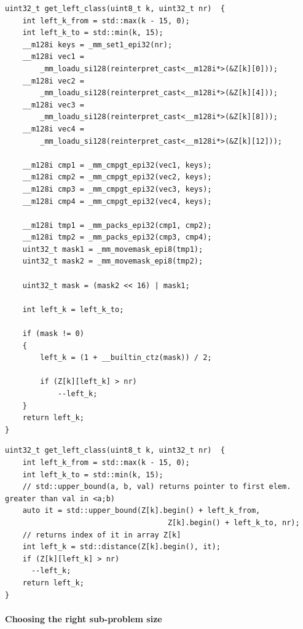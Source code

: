 \begin{lstlisting}
uint32_t get_left_class(uint8_t k, uint32_t nr)  {
	int left_k_from = std::max(k - 15, 0);
	int left_k_to = std::min(k, 15);
	__m128i keys = _mm_set1_epi32(nr);
	__m128i vec1 =
		_mm_loadu_si128(reinterpret_cast<__m128i*>(&Z[k][0]));
	__m128i vec2 =
		_mm_loadu_si128(reinterpret_cast<__m128i*>(&Z[k][4]));
	__m128i vec3 =
		_mm_loadu_si128(reinterpret_cast<__m128i*>(&Z[k][8]));
	__m128i vec4 =
		_mm_loadu_si128(reinterpret_cast<__m128i*>(&Z[k][12]));

	__m128i cmp1 = _mm_cmpgt_epi32(vec1, keys);
	__m128i cmp2 = _mm_cmpgt_epi32(vec2, keys);
	__m128i cmp3 = _mm_cmpgt_epi32(vec3, keys);
	__m128i cmp4 = _mm_cmpgt_epi32(vec4, keys);

	__m128i tmp1 = _mm_packs_epi32(cmp1, cmp2);
	__m128i tmp2 = _mm_packs_epi32(cmp3, cmp4);
	uint32_t mask1 = _mm_movemask_epi8(tmp1);
	uint32_t mask2 = _mm_movemask_epi8(tmp2);

	uint32_t mask = (mask2 << 16) | mask1;

	int left_k = left_k_to;

	if (mask != 0)
	{
		left_k = (1 + __builtin_ctz(mask)) / 2;

		if (Z[k][left_k] > nr)
			--left_k;
	}
	return left_k;
}
\end{lstlisting}

\begin{lstlisting}
uint32_t get_left_class(uint8_t k, uint32_t nr)  {
	int left_k_from = std::max(k - 15, 0);
	int left_k_to = std::min(k, 15);
	// std::upper_bound(a, b, val) returns pointer to first elem. greater than val in <a;b) 
	auto it = std::upper_bound(Z[k].begin() + left_k_from,
                                     Z[k].begin() + left_k_to, nr);
	// returns index of it in array Z[k]
    int left_k = std::distance(Z[k].begin(), it);
    if (Z[k][left_k] > nr)
      --left_k;
	return left_k;
}
\end{lstlisting}

\paragraph{Choosing the right sub-problem size}

